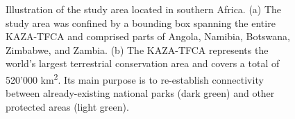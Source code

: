\documentclass[abstract=on,10pt,a4paper,bibliography=totocnumbered]{article}
\begin{document}
\begin{figure}[h]
  \begin{center}
    \caption{Illustration of the study area located in southern Africa. (a) The
    study area was confined by a bounding box spanning the entire KAZA-TFCA and
    comprised parts of Angola, Namibia, Botswana, Zimbabwe, and Zambia. (b)
    The KAZA-TFCA represents the world's largest terrestrial conservation area
    and covers a total of 520'000 km\textsuperscript{2}. Its main purpose is to
    re-establish connectivity between already-existing national parks (dark
    green) and other protected areas (light green).}
    \label{StudyArea}
  \end{center}
\end{figure}
\end{document}
